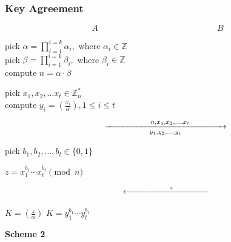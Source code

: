\documentclass{beamer}
\begin{document}
\begin{frame}
\frametitle{Key Agreement}

  	\small{	
  		\begin{equation*}
  		A \qquad  \qquad \qquad \qquad \qquad \qquad \qquad B
  		\end{equation*}
  		
  		\noindent pick $\alpha = \prod_{i=1}^{i=k} \alpha_i,$ where $\alpha_i \in \mathbb{Z}$ \\
  		pick $\beta = \prod_{i=1}^{i=k} \beta_i,$ where $\beta_i \in \mathbb{Z}$ \\
  		compute $n = \alpha \cdot \beta $
  				
  		\bigskip
  				
  		\noindent 
  		pick $x_1, x_2, \ldots x_t \in \mathbb{Z}_n^*$ \\
  		compute $y_i = (\frac{x_i}{\alpha}), 1 \leq i \leq t$
  				 
  		\begin{equation*}
  		\qquad \xrightarrow[y_1,y_2, \ldots, y_t]{\hspace*{1.8cm} n,x_1,x_2,\ldots,x_t \qquad \qquad}  
  		\end{equation*}
  				
   
  				
  		\hspace{80mm} pick $b_1, b_2, \ldots, b_t \in \{ 0,1\}$ 
  				
  		\hspace{80mm} $z= x_1^{b_1} \cdots x_t^{b_t} \pmod{n}$
  				
  				
  		\begin{equation*}
  		\qquad \xleftarrow{\hspace*{1.8cm} z \qquad \qquad}  
  		\end{equation*}   
  				
  		$K = (\frac{z}{\alpha})$ \hspace{80mm} $K = y_1^{b_1} \cdots y_t^{b_t}$
  		
  		  \begin{center}
  		\textbf{Scheme 2}
  		\end{center}		
  	}	

\end{frame}

\end{document}
